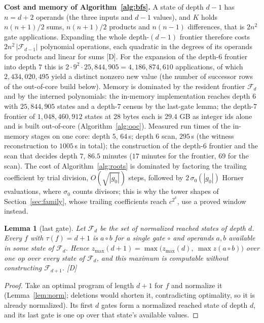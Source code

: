 \documentclass[11pt]{article}
\newtheorem{lemma}[theorem]{Lemma}
\theoremstyle{definition}
\theoremstyle{remark}
\newcommand{\zmax}{z_{\max}}
\begin{document}
\textbf{Cost and memory of Algorithm~\ref{alg:bfs}.} A state of depth $d{-}1$ has
$n = d + 2$ operands (the three inputs and $d - 1$ values), and $K$ holds
$n(n{+}1)/2$ sums, $n(n{+}1)/2$ products and $n(n{-}1)$ differences, that is $2n^2$ gate
applications. Expanding the whole depth-$(d{-}1)$ frontier therefore costs
$2 n^2 \, |\mathcal{F}_{d-1}|$ polynomial operations, each quadratic in the degrees of its
operands for products and linear for sums [D]. For the expansion of the depth-$6$ frontier
into depth $7$ this is $2 \cdot 9^2 \cdot 25{,}844{,}905 = 4{,}186{,}874{,}610$
applications, of which $2{,}434{,}020{,}495$ yield a distinct nonzero new value
(the number of successor rows of the out-of-core build below). Memory is dominated by the
resident frontier $\mathcal{F}_d$ and by the interned polynomials: the in-memory
implementation reaches depth $6$ with $25{,}844{,}905$ states and a depth-$7$ census by
the last-gate lemma; the depth-$7$ frontier of $1{,}048{,}460{,}912$ states at $28$ bytes
each is $29.4$ GB as integer ids alone and is built out-of-core (Algorithm~\ref{alg:ooc}).
Measured run times of the in-memory stages on one core: depth $5$, $64$\,s; depth $6$
scan, $295$\,s (the witness reconstruction to $1005$\,s in total); the construction of the
depth-$6$ frontier and the scan that decides depth $7$, $86.5$ minutes ($17$ minutes for the
frontier, $69$ for the scan). The cost of Algorithm~\ref{alg:roots} is dominated by
factoring the trailing coefficient by trial division, $O(\sqrt{|g_0|})$ steps, followed by
$2\,\sigma_0(|g_0|)$ Horner evaluations, where $\sigma_0$ counts divisors; this is why the
tower shapes of Section~\ref{sec:family}, whose trailing coefficients reach $c^{2^k}$, use a
proved window instead.

\begin{lemma}[last gate]\label{lem:lastgate}
Let $\mathcal{F}_d$ be the set of normalized reached states of depth $d$. Every $f$
with $\tau(f) = d + 1$ is $a \circ b$ for a single gate $\circ$ and operands $a, b$
available in some state of $\mathcal{F}_d$. Hence
$\zmax(d+1) = \max\bigl(\zmax(d),\ \max z(a \circ b)\bigr)$ over one op over every
state of $\mathcal{F}_d$, and this maximum is computable without constructing
$\mathcal{F}_{d+1}$. \emph{[D]}
\end{lemma}
\begin{proof}
Take an optimal program of length $d + 1$ for $f$ and normalize it
(Lemma~\ref{lem:norm}; deletions would shorten it, contradicting optimality, so it is
already normalized). Its first $d$ gates form a normalized reached state of depth
$d$, and its last gate is one op over that state's available values.
\end{proof}
\end{document}
